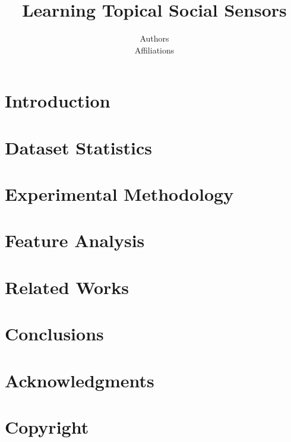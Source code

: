 \documentclass[letterpaper]{article}
\begin{document}
%
\title{Learning Topical Social Sensors}
\author{Authors\\
Affiliations
}
\maketitle
\begin{abstract}

\end{abstract}

\section{Introduction}


\section{Dataset Statistics}


\section{Experimental Methodology}
\label{sec:methodology}


\section{Feature Analysis}


\section{Related Works}


\section{Conclusions}


\section{Acknowledgments}


\section{Copyright}



\end{document}
